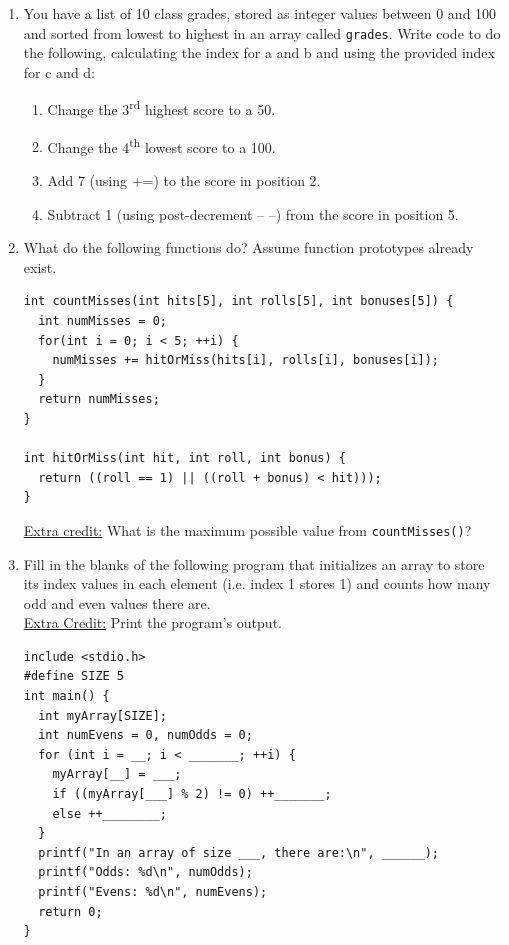 \documentclass[letter,11pt]{article}
\begin{document}
\begin{enumerate}
    \item You have a list of 10 class grades, stored as integer values between 0 and 100 and sorted from lowest to highest in an array called \texttt{grades}. Write code to do the following, calculating the index for a and b and using the provided index for c and d:
    \begin{enumerate}
        \item Change the 3\textsuperscript{rd} highest score to a 50.
        \item Change the 4\textsuperscript{th} lowest score to a 100.
        \item Add 7 (using +=) to the score in position 2.
        \item Subtract 1 (using post-decrement -- --) from the score in position 5.
    \end{enumerate}
    
    \item What do the following functions do? Assume function prototypes already exist.
    \begin{verbatim}
int countMisses(int hits[5], int rolls[5], int bonuses[5]) {
  int numMisses = 0;
  for(int i = 0; i < 5; ++i) {
    numMisses += hitOrMiss(hits[i], rolls[i], bonuses[i]);
  }
  return numMisses;
}

int hitOrMiss(int hit, int roll, int bonus) {
  return ((roll == 1) || ((roll + bonus) < hit)));   
}
    \end{verbatim}
    \underline{Extra credit:} What is the maximum possible value from \texttt{countMisses()}?
    
    \newpage
    \item Fill in the blanks of the following program that initializes an array to store its index values in each element (i.e. index 1 stores 1) and counts how many odd and even values there are. \\
    \underline{Extra Credit:} Print the program’s output.
    \begin{verbatim}
include <stdio.h>
#define SIZE 5
int main() {
  int myArray[SIZE];
  int numEvens = 0, numOdds = 0;
  for (int i = __; i < _______; ++i) {
    myArray[__] = ___;
    if ((myArray[___] % 2) != 0) ++_______;
    else ++________;
  }
  printf("In an array of size ___, there are:\n", ______);
  printf("Odds: %d\n", numOdds);
  printf("Evens: %d\n", numEvens);
  return 0;
}
    \end{verbatim}
\end{enumerate}
\end{document}
